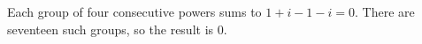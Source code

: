 Each group of four consecutive powers sums to $1+i-1-i=0$. There are seventeen such groups, so the result is $\boxed0$.
